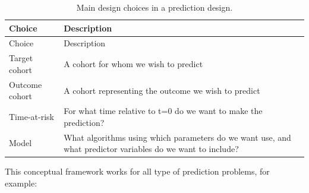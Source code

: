 \documentclass[11pt]{book}
\theoremstyle{definition}
\theoremstyle{definition}
\theoremstyle{definition}
\theoremstyle{remark}
\begin{document}
\begin{longtable}[]{@{}ll@{}}
\caption{\label{tab:plpDesign} Main design choices in a prediction design.}\tabularnewline
\toprule
\begin{minipage}[b]{0.23\columnwidth}\raggedright
Choice\strut
\end{minipage} & \begin{minipage}[b]{0.72\columnwidth}\raggedright
Description\strut
\end{minipage}\tabularnewline
\midrule
\endfirsthead
\toprule
\begin{minipage}[b]{0.23\columnwidth}\raggedright
Choice\strut
\end{minipage} & \begin{minipage}[b]{0.72\columnwidth}\raggedright
Description\strut
\end{minipage}\tabularnewline
\midrule
\endhead
\begin{minipage}[t]{0.23\columnwidth}\raggedright
Target cohort\strut
\end{minipage} & \begin{minipage}[t]{0.72\columnwidth}\raggedright
A cohort for whom we wish to predict\strut
\end{minipage}\tabularnewline
\begin{minipage}[t]{0.23\columnwidth}\raggedright
Outcome cohort\strut
\end{minipage} & \begin{minipage}[t]{0.72\columnwidth}\raggedright
A cohort representing the outcome we wish to predict\strut
\end{minipage}\tabularnewline
\begin{minipage}[t]{0.23\columnwidth}\raggedright
Time-at-risk\strut
\end{minipage} & \begin{minipage}[t]{0.72\columnwidth}\raggedright
For what time relative to t=0 do we want to make the prediction?\strut
\end{minipage}\tabularnewline
\begin{minipage}[t]{0.23\columnwidth}\raggedright
Model\strut
\end{minipage} & \begin{minipage}[t]{0.72\columnwidth}\raggedright
What algorithms using which parameters do we want use, and what predictor variables do we want to include?\strut
\end{minipage}\tabularnewline
\bottomrule
\end{longtable}

This conceptual framework works for all type of prediction problems, for example:
\end{document}
